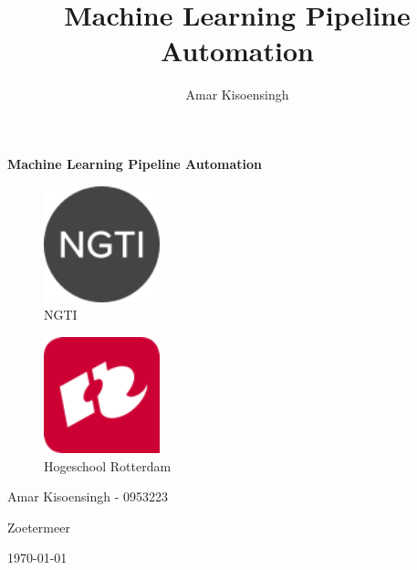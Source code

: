 \documentclass[11pt, a4paper]{report}
\title{Machine Learning Pipeline Automation}
\author{Amar Kisoensingh}
\begin{document}
  \begin{titlepage}
    \centering
    \vspace*{8cm}
    {\huge\bfseries Machine Learning Pipeline Automation\par}
    \vfill
    
    \begin{figure}[hbt!]
      \centering
      \begin{minipage}{0.5\textwidth}
          \centering
          \includegraphics[width=0.3\textwidth]{ngti-logo.png}
          \vspace{.25cm}
          \\ {\Large NGTI}
      \end{minipage}\hfill
      \begin{minipage}{0.5\textwidth}
          \centering
          \includegraphics[width=0.3\textwidth]{hr-logo.png}
          \vspace{.25cm}
          \\ {\Large Hogeschool Rotterdam}
      \end{minipage}
    \end{figure}

    \vspace{2cm}
  
    {\Large Amar Kisoensingh - 0953223\par}
    {\large Zoetermeer\par}
    {\large \today\par}
  \end{titlepage}
\end{document}
